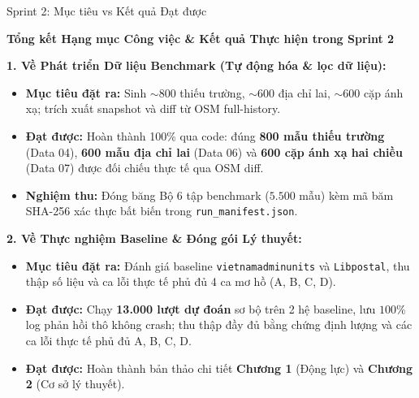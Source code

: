 \documentclass[aspectratio=169,9pt]{beamer}
\begin{document}
\begin{frame}{Sprint 2: Mục tiêu vs Kết quả Đạt được}
  \vspace{-0.05cm}
  \centerline{\large\textbf{Tổng kết Hạng mục Công việc \& Kết quả Thực hiện trong Sprint 2}}
  \vspace{0.1cm}

  {\small
  \textbf{1. Về Phát triển Dữ liệu Benchmark (Tự động hóa \& lọc dữ liệu):}
  \begin{itemize}
    \setlength{\itemsep}{1.2pt}
    \item \textbf{Mục tiêu đặt ra:} Sinh $\sim$800 thiếu trường, $\sim$600 địa chỉ lai, $\sim$600 cặp ánh xạ; trích xuất snapshot và diff từ OSM full-history.
    \item \textbf{Đạt được:} Hoàn thành 100\% qua code: đúng \textbf{800 mẫu thiếu trường} (Data 04), \textbf{600 mẫu địa chỉ lai} (Data 06) và \textbf{600 cặp ánh xạ hai chiều} (Data 07) được đối chiếu thực tế qua OSM diff.
    \item \textbf{Nghiệm thu:} Đóng băng Bộ 6 tập benchmark ($5.500$ mẫu) kèm mã băm SHA-256 xác thực bất biến trong \texttt{run\_manifest.json}.
  \end{itemize}

  \vspace{0.08cm}
  \textbf{2. Về Thực nghiệm Baseline \& Đóng gói Lý thuyết:}
  \begin{itemize}
    \setlength{\itemsep}{1.2pt}
    \item \textbf{Mục tiêu đặt ra:} Đánh giá baseline \texttt{vietnamadminunits} và \texttt{Libpostal}, thu thập số liệu và ca lỗi thực tế phủ đủ 4 ca mơ hồ (A, B, C, D).
    \item \textbf{Đạt được:} Chạy \textbf{13.000 lượt dự đoán} sơ bộ trên 2 hệ baseline, lưu $100\%$ log phản hồi thô không crash; thu thập đầy đủ bằng chứng định lượng và các ca lỗi thực tế phủ đủ A, B, C, D.
    \item \textbf{Đạt được:} Hoàn thành bản thảo chi tiết \textbf{Chương 1} (Động lực) và \textbf{Chương 2} (Cơ sở lý thuyết).
  \end{itemize}
  }
\end{frame}
\end{document}

